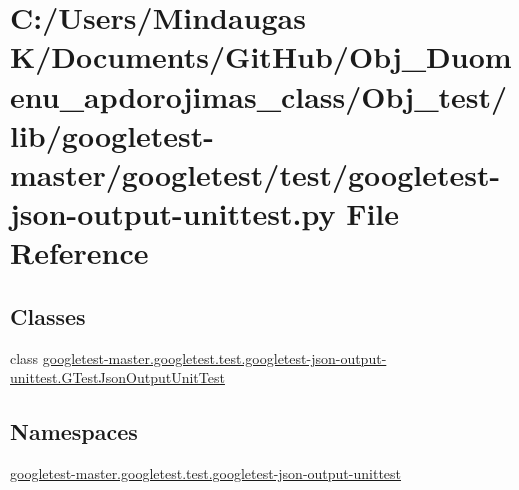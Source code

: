 \hypertarget{_obj__test_2lib_2googletest-master_2googletest_2test_2googletest-json-output-unittest_8py}{}\section{C\+:/\+Users/\+Mindaugas K/\+Documents/\+Git\+Hub/\+Obj\+\_\+\+Duomenu\+\_\+apdorojimas\+\_\+class/\+Obj\+\_\+test/lib/googletest-\/master/googletest/test/googletest-\/json-\/output-\/unittest.py File Reference}
\label{_obj__test_2lib_2googletest-master_2googletest_2test_2googletest-json-output-unittest_8py}
\subsection*{Classes}
\begin{DoxyCompactItemize}
\item 
class \mbox{\hyperlink{classgoogletest-master_1_1googletest_1_1test_1_1googletest-json-output-unittest_1_1_g_test_json_output_unit_test}{googletest-\/master.\+googletest.\+test.\+googletest-\/json-\/output-\/unittest.\+G\+Test\+Json\+Output\+Unit\+Test}}
\end{DoxyCompactItemize}
\subsection*{Namespaces}
\begin{DoxyCompactItemize}
\item 
 \mbox{\hyperlink{namespacegoogletest-master_1_1googletest_1_1test_1_1googletest-json-output-unittest}{googletest-\/master.\+googletest.\+test.\+googletest-\/json-\/output-\/unittest}}
\end{DoxyCompactItemize}
